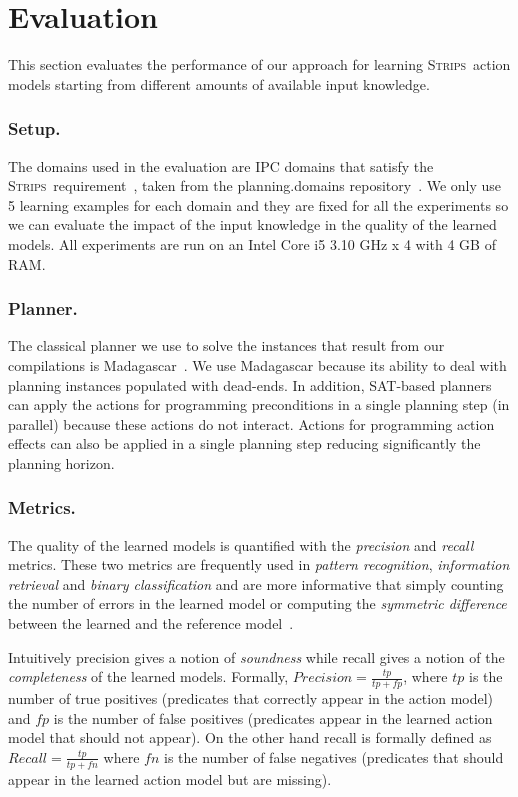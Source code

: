 \documentclass[letterpaper]{article} %
\newcommand{\strips}{\textsc{Strips}}     %
\begin{document}
\section{Evaluation}
This section evaluates the performance of our approach for learning \strips\ action models starting from different amounts of available input knowledge.

\subsubsection{Setup.}
The domains used in the evaluation are IPC domains that satisfy the \strips\ requirement~\cite{fox2003pddl2}, taken from the {\sc planning.domains} repository~\cite{muise2016planning}. We only use 5 learning examples for each domain and they are fixed for all the experiments so we can evaluate the impact of the input knowledge in the quality of the learned models. All experiments are run on an Intel Core i5 3.10 GHz x 4 with 4 GB of RAM. 

\subsubsection{Planner.}
The classical planner we use to solve the instances that result from our compilations is {\sc Madagascar}~\cite{rintanen2014madagascar}. We use {\sc Madagascar} because its ability to deal with planning instances populated with dead-ends. In addition, SAT-based planners can apply the actions for programming preconditions in a single planning step (in parallel) because these actions do not interact. Actions for programming action effects can also be applied in a single planning step reducing significantly the planning horizon.

\subsubsection{Metrics.}
The quality of the learned models is quantified with the {\em precision} and {\em recall} metrics. These two metrics are frequently used in {\em pattern recognition}, {\em information retrieval} and {\em binary classification} and are more informative that simply counting the number of errors in the learned model or computing the {\em symmetric difference} between the learned and the reference model~\cite{davis2006relationship}.

Intuitively precision gives a notion of {\em soundness} while recall gives a notion of the {\em completeness} of the learned models. Formally, $Precision=\frac{tp}{tp+fp}$, where $tp$ is the number of true positives (predicates that correctly appear in the action model) and $fp$ is the number of false positives (predicates appear in the learned action model that should not appear). On the other hand recall is formally defined as $Recall=\frac{tp}{tp+fn}$ where $fn$ is the number of false negatives (predicates that should appear in the learned action model but are missing).
\end{document}
